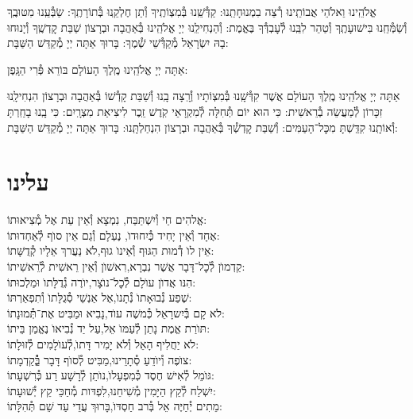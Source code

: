 \documentclass[twoside, openany, parskip=half, 11pt]{book}
\begin{document}
אֱלֹהֵֽינוּ וֵאלֹהֵי אֲבוֹתֵֽינוּ רְ֯צֵה בִמְנוּחָתֵֽנוּ: קַדְּ֯שֵֽׁנוּ בְּ֯מִצְוֹתֶֽיךָ וְ֯תֵן חֶלְקֵֽנוּ בְּ֯תוֹרָתֶֽךָ: שַׂבְּ֯עֵֽנוּ מִטּוּבֶֽךָ וְ֯שַׂמְּ֯חֵֽנוּ בִּישׁוּעָתֶֽךָ וְ֯טַהֵר לִבֵּֽנוּ לְ֯עׇבְדְּ֯ךָ בֶּאֱמֶת: וְ֯הַנְחִילֵֽנוּ יְיָ אֱלֹהֵֽינוּ בְּ֯אַהֲבָה וּבְרָצוֹן שַׁבַּת קׇדְשֶֽׁךָ וְ֯יָנוּחוּ בָהּ יִשְׂרָאֵל מְ֯קַדְּ֯שֵׁי שְׁ֯מֶךָ: בָּרוּךְ אַתָּה יְיָ מְ֯קַדֵּשׁ הַשַּׁבָּת:

\fullkaddish


אַתָּה יְיָ אֱלֹהֵֽינוּ מֶֽלֶךְ הָעוֹלָם בּוֹרֵא פְּ֯רִי הַגָּֽפֶן:

אַתָּה יְיָ אֱלֹהֵֽינוּ מֶֽלֶךְ הָעוֹלָם אֲשֶׁר קִדְּ֯שָֽׁנוּ בְּ֯מִצְוֹתָיו וְ֯רָֽצָה בָֽנוּ וְ֯שַׁבַּת קָדְ֯שׁוֹ בְּ֯אַהֲבָה וּבְרָצוֹן הִנְחִילָֽנוּ זִכָּרוֹן לְ֯מַעֲשֵׂה בְ֯רֵאשִׁית: כִּי הוּא יוֹם תְּ֯חִלָּה לְ֯מִקְרָאֵי קֹֽדֶשׁ זֵֽכֶר לִיצִיאַת מִצְרָֽיִם: כִּי בָֽנוּ בָחַֽרְתָּ וְ֯אוֹתָֽנוּ קִדַּֽשְׁתָּ מִכׇּל־הָעַמִּים: וְ֯שַׁבַּת קׇדְשְׁ֯ךָ בְּ֯אַהֲבָה וּבְרָצוֹן הִנְחַלְתָּֽנוּ: בָּרוּךְ אַתָּה יְיָ מְ֯קַדֵּשׁ הַשַּׁבָּת:



\section*{ עלינו }
\aleinu






אֱלהִים חַי וְ֯יִשְׁתַּבַּח, \hfill נִמְצָא וְ֯אֵין עֵת אֶל מְ֯צִיאוּתוֹ: \\
אֶחָד וְ֯אֵין יָחִיד כְּ֯יִחוּדוׂ, \hfill נֶעְלָם וְ֯גַם אֵין סוׂף לְ֯אַחְדוּתוֹ: \\
אֵין לוׂ דְ֯מוּת הַגּוּף וְ֯אֵינוׂ גוּף,\hfill לׂא נַעֲרךְ אֵלָיו קְ֯דֻשָּׁתוֹ: \\
קַדְמוׂן לְ֯כׇל־דָּבָר אֲשֶׁר נִבְרָא,\hfill רִאשׁוׂן וְ֯אֵין רֵאשִׁית לְ֯רֵאשִׁיתוֹ: \\
הִנּו אֲדוׂן עוׂלָם לְ֯כׇל־נוׂצָר,\hfill יוׂרֶה גְ֯דֻלָּתוׂ וּמַלְכוּתוֹ: \\
שֶׁפַע נְ֯בוּאָתוׂ נְ֯תָנוׂ,\hfill אֶל אַנְשֵׁי סְ֯גֻלָּתוׂ וְ֯תִפְאַרְתּוֹ: \\
לׂא קָם בְּ֯יִשרָאֵל כְּ֯משֶׁה עוׂד,\hfill נָבִיא וּמַבִּיט אֶת־תְּ֯מוּנָתוֹ: \\
תּוׂרַת אֱמֶת נָתַן לְ֯עַמּוׂ אֵל,\hfill עַל יַד נְ֯בִיאוׂ נֶאֱמַן בֵּיתוֹ: \\
לׂא יַחֲלִיף הָאֵל וְ֯לׂא יָמִיר דָּתוׂ,\hfill לְ֯עוׂלָמִים לְ֯זוּלָתוֹ: \\
צוׂפֶה וְ֯יוׂדֵעַ סְ֯תָרֵינוּ,\hfill מַבִּיט לְ֯סוׂף דָּבָר בְְַּ֯֯קַדְמָתוֹ: \\
גּוׂמֵל לְ֯אִישׁ חֶסֶד כְּ֯מִפְעָלוׂ,\hfill נוׂתֵן לְ֯רָשָׁע רַע כְּ֯רִשְׁעָתוֹ: \\
יִשְׁלַח לְ֯קֵץ הַיָּמִין מְ֯שִׁיחֵנוּ,\hfill לִפְדּות מְ֯חַכֵּי קֵץ יְ֯שׁוּעָתוֹ: \\
מֵתִים יְ֯חַיֶּה אֵל בְּ֯רב חַסְדּוׂ,\hfill בָּרוּךְ עֲדֵי עַד שֵׁם תְּ֯הִלָּתוֹ:\\
\end{document}
